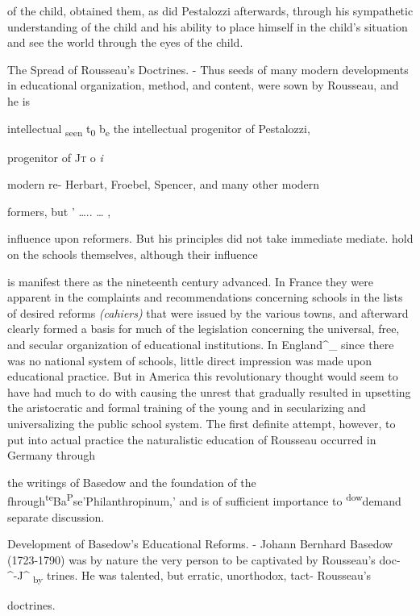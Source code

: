 \documentclass[
]{book}
\begin{document}
of the child, obtained them, as did Pestalozzi afterwards, through his sympathetic understanding of the child and his ability to place himself in the child's situation and see the world through the eyes of the child.

The Spread of Rousseau's Doctrines. - Thus seeds of many modern developments in educational organization, method, and content, were sown by Rousseau, and he is

intellectual \textsubscript{seen} t\textsubscript{0} b\textsubscript{e} the intellectual progenitor of Pestalozzi,

progenitor of \textsc{Jt }o \emph{i}

modern re- Herbart, Froebel, Spencer, and many other modern

formers, but ' \ldots.. \ldots{} ,

influence upon reformers. But his principles did not take immediate mediate. hold on the schools themselves, although their influence

is manifest there as the nineteenth century advanced. In France they were apparent in the complaints and recommendations concerning schools in the lists of desired reforms \emph{(cahiers)} that were issued by the various towns, and afterward clearly formed a basis for much of the legislation concerning the universal, free, and secular organization of educational institutions. In England\^{}\_ since there was no national system of schools, little direct impression was made upon educational practice. But in America this revolutionary thought would seem to have had much to do with causing the unrest that gradually resulted in upsetting the aristocratic and formal training of the young and in secularizing and universalizing the public school system. The first definite attempt, however, to put into actual practice the naturalistic education of Rousseau occurred in Germany through

the writings of Basedow and the foundation of the fhrough\textsuperscript{te}Ba\textsuperscript{P}se'Philanthropinum,' and is of sufficient importance to \textsuperscript{dow}demand separate discussion.

Development of Basedow's Educational Reforms. - Johann Bernhard Basedow (1723-1790) was by nature the very person to be captivated by Rousseau's doc- \^{}-J\^{} \textsubscript{by} trines. He was talented, but erratic, unorthodox, tact- Rousseau's

doctrines.
\end{document}
